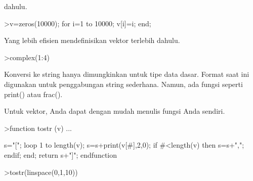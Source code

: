 \documentclass[a4paper,10pt]{article}
\begin{document}
\begin{eulernotebook}
\begin{eulercomment}
\begin{eulercomment}
\begin{eulercomment}
\begin{eulercomment}
\begin{eulercomment}
\begin{eulercomment}
\begin{eulercomment}
\begin{eulercomment}
\begin{eulercomment}
\begin{eulercomment}
\begin{eulercomment}
\begin{eulercomment}
\begin{eulercomment}
\begin{eulercomment}
\begin{eulercomment}
\begin{eulercomment}
\begin{eulercomment}
\begin{eulercomment}
\begin{eulercomment}
\begin{eulercomment}
\begin{eulercomment}
\begin{eulercomment}
\begin{eulercomment}
\begin{eulercomment}
\begin{eulercomment}
\begin{eulercomment}
\begin{eulercomment}
\begin{eulercomment}
\begin{eulercomment}
\begin{eulercomment}
\begin{eulercomment}
\begin{eulercomment}
\begin{eulercomment}
\begin{eulercomment}
\begin{eulercomment}
\begin{eulercomment}
\begin{eulercomment}
\begin{eulercomment}
\begin{eulercomment}
\begin{eulercomment}
\begin{eulercomment}
\begin{eulercomment}
\begin{eulercomment}
\begin{eulercomment}
\begin{eulercomment}
\begin{eulercomment}
\begin{eulercomment}
\begin{eulercomment}
\begin{eulercomment}
\begin{eulercomment}
\begin{eulercomment}
\begin{eulercomment}
\begin{eulercomment}
\begin{eulercomment}
\begin{eulercomment}
\begin{eulercomment}
\begin{eulercomment}
\begin{eulercomment}
\begin{eulercomment}
\begin{eulercomment}
\begin{eulercomment}
\begin{eulercomment}
\begin{eulercomment}
\begin{eulercomment}
\begin{eulercomment}
\begin{eulercomment}
\begin{eulercomment}
\begin{eulercomment}
\begin{eulercomment}
dahulu.
\end{eulercomment}
\begin{eulerprompt}
>v=zeros(10000); for i=1 to 10000; v[i]=i; end;
\end{eulerprompt}
\begin{eulercomment}
Yang lebih efisien mendefinisikan vektor terlebih dahulu.
\end{eulercomment}
\begin{eulerprompt}
>complex(1:4)
\end{eulerprompt}
\begin{euleroutput}
  [ 1+0i ,  2+0i ,  3+0i ,  4+0i  ]
\end{euleroutput}
\begin{eulercomment}
Konversi ke string hanya dimungkinkan untuk tipe data dasar. Format
saat ini digunakan untuk penggabungan string sederhana. Namun, ada
fungsi seperti print() atau frac().

Untuk vektor, Anda dapat dengan mudah menulis fungsi Anda sendiri.
\end{eulercomment}
\begin{eulerprompt}
>function tostr (v) ...
\end{eulerprompt}
\begin{eulerudf}
  s="[";
  loop 1 to length(v);
     s=s+print(v[#],2,0);
     if #<length(v) then s=s+","; endif;
  end;
  return s+"]";
  endfunction
\end{eulerudf}
\begin{eulerprompt}
>tostr(linspace(0,1,10))
\end{eulerprompt}
\begin{euleroutput}
  
\end{euleroutput}
\end{eulercomment}
\end{eulercomment}
\end{eulercomment}
\end{eulercomment}
\end{eulercomment}
\end{eulercomment}
\end{eulercomment}
\end{eulercomment}
\end{eulercomment}
\end{eulercomment}
\end{eulercomment}
\end{eulercomment}
\end{eulercomment}
\end{eulercomment}
\end{eulercomment}
\end{eulercomment}
\end{eulercomment}
\end{eulercomment}
\end{eulercomment}
\end{eulercomment}
\end{eulercomment}
\end{eulercomment}
\end{eulercomment}
\end{eulercomment}
\end{eulercomment}
\end{eulercomment}
\end{eulercomment}
\end{eulercomment}
\end{eulercomment}
\end{eulercomment}
\end{eulercomment}
\end{eulercomment}
\end{eulercomment}
\end{eulercomment}
\end{eulercomment}
\end{eulercomment}
\end{eulercomment}
\end{eulercomment}
\end{eulercomment}
\end{eulercomment}
\end{eulercomment}
\end{eulercomment}
\end{eulercomment}
\end{eulercomment}
\end{eulercomment}
\end{eulercomment}
\end{eulercomment}
\end{eulercomment}
\end{eulercomment}
\end{eulercomment}
\end{eulercomment}
\end{eulercomment}
\end{eulercomment}
\end{eulercomment}
\end{eulercomment}
\end{eulercomment}
\end{eulercomment}
\end{eulercomment}
\end{eulercomment}
\end{eulercomment}
\end{eulercomment}
\end{eulercomment}
\end{eulercomment}
\end{eulercomment}
\end{eulercomment}
\end{eulercomment}
\end{eulercomment}
\end{eulercomment}
\end{eulernotebook}
\end{document}
